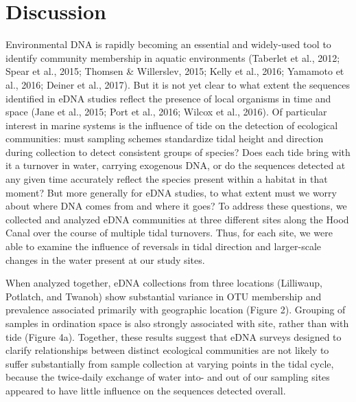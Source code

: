 \documentclass[fleqn,10pt,lineno]{wlpeerj} %
\begin{document}
\section{Discussion}\label{discussion}

Environmental DNA is rapidly becoming an essential and widely-used tool
to identify community membership in aquatic environments (Taberlet et
al., 2012; Spear et al., 2015; Thomsen \& Willerslev, 2015; Kelly et
al., 2016; Yamamoto et al., 2016; Deiner et al., 2017). But it is not yet
clear to what extent the sequences identified in eDNA studies reflect
the presence of local organisms in time and space (Jane et al.,
2015; Port et al., 2016; Wilcox et al., 2016). Of particular interest in
marine systems is the influence of tide on the detection of ecological
communities: must sampling schemes standardize tidal height and
direction during collection to detect consistent groups of species? Does
each tide bring with it a turnover in water, carrying exogenous DNA, or
do the sequences detected at any given time accurately reflect the
species present within a habitat in that moment? But more generally for
eDNA studies, to what extent must we worry about where DNA comes from
and where it goes? To address these questions, we collected and analyzed
eDNA communities at three different sites along the Hood Canal over the
course of multiple tidal turnovers. Thus, for each site, we were able to
examine the influence of reversals in tidal direction and larger-scale
changes in the water present at our study sites.

When analyzed together, eDNA collections from three locations
(Lilliwaup, Potlatch, and Twanoh) show substantial variance in OTU
membership and prevalence associated primarily with geographic location
(Figure 2). Grouping of samples in ordination space is also strongly
associated with site, rather than with tide (Figure 4a). Together, these
results suggest that eDNA surveys designed to clarify relationships
between distinct ecological communities are not likely to suffer
substantially from sample collection at varying points in the tidal
cycle, because the twice-daily exchange of water into- and out of our
sampling sites appeared to have little influence on the sequences
detected overall.
\end{document}
